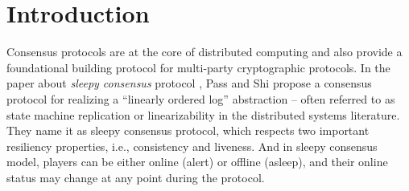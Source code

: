 \documentclass{llncs}
\begin{document}
%
\newpage
\tableofcontents
\newpage
%
\section{Introduction}

\quad Consensus protocols are at the core of distributed computing and also provide a foundational building protocol for multi-party cryptographic protocols. In the paper about \emph{sleepy consensus} protocol \cite{Sleepy}, Pass and Shi propose a consensus protocol for realizing a “linearly ordered log” abstraction -- often referred to as state machine replication or linearizability in the distributed systems literature. They name it as sleepy consensus protocol, which respects two important resiliency properties, i.e., consistency and liveness. And in sleepy consensus model, players can be either online (alert) or offline (asleep), and their online status may change at any point during the protocol.
\end{document}
